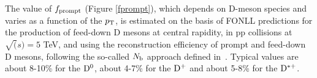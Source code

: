 The value of $f_{\rm prompt}$ (Figure \ref{fprompt}), which depends on D-meson species and varies as a function of the $p_{\rm T}$, is estimated on the basis of FONLL predictions for the production of feed-down D mesons at central rapidity, in pp collisions at $\sqrt(s) = 5$ TeV, and using the reconstruction efficiency of prompt and feed-down D mesons, following the so-called $N_{\rm b}$ approach defined in~\cite{ALICEDmespp7Tev}. Typical values are about 8-10\% for the
${\rm D^0}$, about 4-7\% for the ${\rm D^+}$ and about 5-8\% for the ${\rm D^{*+}}$. %
